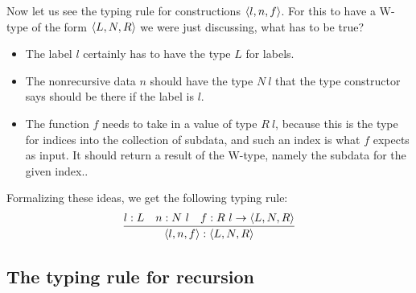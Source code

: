 \documentclass{article}
\begin{document}
Now let us see the typing rule for constructions $\langle l , n, f \rangle$.  For this
to have a W-type of the form $\langle L , N , R \rangle$ we were just discussing, what has
to be true?

\begin{itemize}
\item The label $l$ certainly has to have the type $L$ for labels.
\item The nonrecursive data $n$ should have the type $N\ l$ that
  the type constructor says should be there if the label is $l$.
\item The function $f$ needs to take in a value of type $R\ l$,
  because this is the type for indices into the collection of subdata,
  and such an index is what $f$ expects as input. It should return a
  result of the W-type, namely the subdata for the given index..
\end{itemize}

Formalizing these ideas, we get the following typing rule:
\[
\infer{\ctora{l}{n}{f} : \w{L}{N}{R}}
      {l : L & n : N\ l & f : R\ l \to \w{L}{N}{R}}
      \]
      
\subsection{The typing rule for recursion}
\end{document}
